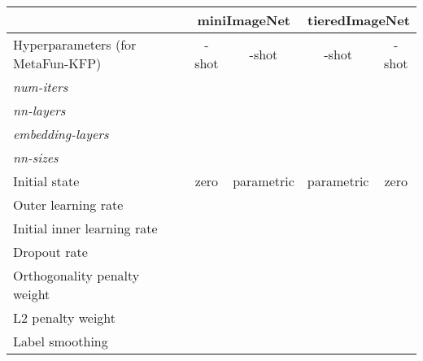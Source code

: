 \documentclass{article}
\theoremstyle{definition}
\begin{document}
\begin{table*}[!htb]
\begin{threeparttable}[]
  \begin{tabular}{l|cc|cc}
  \toprule
    &   \multicolumn{2}{c|}{\textbf{miniImageNet}} &  \multicolumn{2}{c}{\textbf{tieredImageNet}}\\ 
    \toprule
    Hyperparameters (for MetaFun-KFP)\;\;\;\;\;  &   -shot & -shot & -shot & -shot \\ 
    \midrule
    \emph{num-iters} &  &  &  &  \\
    \emph{nn-layers} &  &  &  &  \\
    \emph{embedding-layers} &  &  &  &  \\
    \emph{nn-sizes} &  &  &  &  \\
    Initial state & zero & parametric & parametric & zero \\ 
    \midrule 
    Outer learning rate &  &  &  &  \\ 
    Initial inner learning rate &  &  &  &  \\ 
    Dropout rate &  &  &  &  \\ 
    Orthogonality penalty weight &  &  &   &  \\ 
    L2 penalty weight &  &  &  &  \\ 
    Label smoothing &  &  &  &  \\ 
    \bottomrule
  \end{tabular}
  \label{tb:hyperparameters-chosen}
  \end{threeparttable}
\end{table*}
\end{document}
